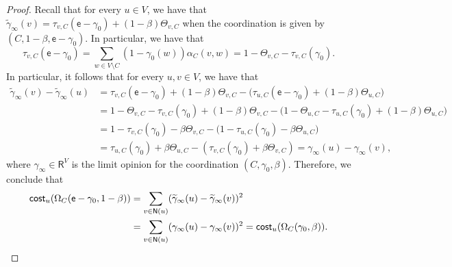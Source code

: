 \documentclass[letterpaper,11pt]{article}
\newcommand{\RR}{\mathsf{R}}
\newcommand{\nsf}{\mathsf{N}}
\newcommand{\cost}{\mathsf{cost}}
\begin{document}
\begin{proof}
Recall that for every $u\in V$, we have that $\widetilde \gamma_{\infty}(v)=\tau_{v,C}(\mathsf{e}-\gamma_0)+(1-\beta)\Theta_{v,C}$ when the coordination is given by $(C,1-\beta,\mathsf{e}-\gamma_0)$.
In particular, we have that 
\begin{equation*}
\tau_{v,C}(\mathsf{e}-\gamma_0)=\sum_{w\in V\setminus C}(1-\gamma_0(w))\alpha_C(v,w)=1-\Theta_{v,C}-\tau_{v,C}(\gamma_0).
\end{equation*}
In particular, it follows that for every $u,v\in V$, we have that 
\begin{align*}
\widetilde \gamma_{\infty}(v)-\widetilde \gamma_{\infty}(u)&=\tau_{v,C}(\mathsf{e}-\gamma_0)+(1-\beta)\Theta_{v,C}-\Big(\tau_{u,C}(\mathsf{e}-\gamma_0)+(1-\beta)\Theta_{u,C}\Big)\\
&=1-\Theta_{v,C}-\tau_{v,C}(\gamma_0)+(1-\beta)\Theta_{v,C}-\Big(1-\Theta_{u,C}-\tau_{u,C}(\gamma_0)+(1-\beta)\Theta_{u,C}\Big)\\
&=1-\tau_{v,C}(\gamma_0)-\beta\Theta_{v,C}-\Big(1-\tau_{u,C}(\gamma_0)-\beta\Theta_{u,C}\Big)\\
&=\tau_{u,C}(\gamma_0)+\beta\Theta_{u,C}-(\tau_{v,C}(\gamma_0)+\beta\Theta_{v,C})=\gamma_{\infty}(u)-\gamma_{\infty}(v),
\end{align*}
where $\gamma_{\infty}\in \RR^V$ is the limit opinion for the coordination $(C,\gamma_0,\beta)$.
Therefore, we conclude that 
\begin{align*}
\cost_u(\Omega_C(\mathsf{e}-\gamma_0,1-\beta))&=\sum_{v\in \nsf(u)}(\widetilde \gamma_{\infty}(u)-\widetilde \gamma_{\infty}(v))^2\\
&=\sum_{v\in \nsf(u)}(\gamma_{\infty}(u)-\gamma_{\infty}(v))^2=\cost_u(\Omega_C(\gamma_0,\beta)).\qedhere
\end{align*}
\end{proof}
\end{document}
